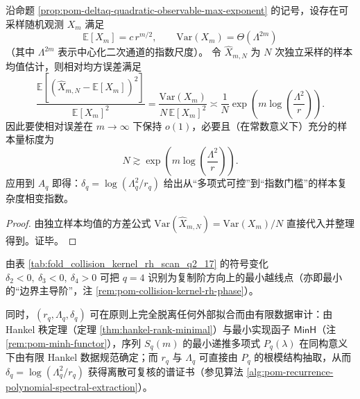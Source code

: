 \begin{corollary}[越线相的最小样本指数阈值]\label{cor:pom-deltaq-sample-complexity-threshold}
沿命题 \ref{prop:pom-deltaq-quadratic-observable-max-exponent} 的记号，设存在可采样随机观测 \(X_m\) 满足
\[
\mathbb E[X_m]=c\,r^{m/2},\qquad \mathrm{Var}(X_m)=\Theta(\Lambda^{2m})
\]
（其中 \(\Lambda^{2m}\) 表示中心化二次通道的指数尺度）。
令 \(\widehat X_{m,N}\) 为 \(N\) 次独立采样的样本均值估计，则相对均方误差满足
\[
\frac{\mathbb E[(\widehat X_{m,N}-\mathbb E[X_m])^2]}{\mathbb E[X_m]^2}
=\frac{\mathrm{Var}(X_m)}{N\,\mathbb E[X_m]^2}
\asymp
\frac{1}{N}\exp\!\left(m\log\!\left(\frac{\Lambda^2}{r}\right)\right).
\]
因此要使相对误差在 \(m\to\infty\) 下保持 \(o(1)\)，必要且（在常数意义下）充分的样本量标度为
\[
N\gtrsim \exp\!\left(m\log\!\left(\frac{\Lambda^2}{r}\right)\right).
\]
应用到 \(A_q\) 即得：\(\delta_q=\log(\Lambda_q^2/r_q)\) 给出从“多项式可控”到“指数门槛”的样本复杂度相变指数。
\end{corollary}
\begin{proof}
由独立样本均值的方差公式
\(
\mathrm{Var}(\widehat X_{m,N})=\mathrm{Var}(X_m)/N
\)
直接代入并整理得到。证毕。
\end{proof}

\begin{remark}[最小边界可见阶与离散证书化]\label{rem:pom-deltaq-minimal-visible-order-auditability}
由表 \ref{tab:fold_collision_kernel_rh_scan_q2_17} 的符号变化
\(
\delta_2<0,\ \delta_3<0,\ \delta_4>0
\)
可把 \(q=4\) 识别为复制阶方向上的最小越线点（亦即最小的“边界主导阶”，注 \ref{rem:pom-collision-kernel-rh-phase}）。
\par
同时，\((r_q,\Lambda_q,\delta_q)\) 可在原则上完全脱离任何外部拟合而由有限数据审计：由 Hankel 秩定理（定理 \ref{thm:hankel-rank-minimal}）与最小实现函子 \(\mathsf{MinH}\)（注 \ref{rem:pom-minh-functor}），序列 \(S_q(m)\) 的最小递推多项式 \(P_q(\lambda)\) 在同构意义下由有限 Hankel 数据规范确定；而 \(r_q\) 与 \(\Lambda_q\) 可直接由 \(P_q\) 的根模结构抽取，从而 \(\delta_q=\log(\Lambda_q^2/r_q)\) 获得离散可复核的谱证书（参见算法 \ref{alg:pom-recurrence-polynomial-spectral-extraction}）。
\end{remark}

